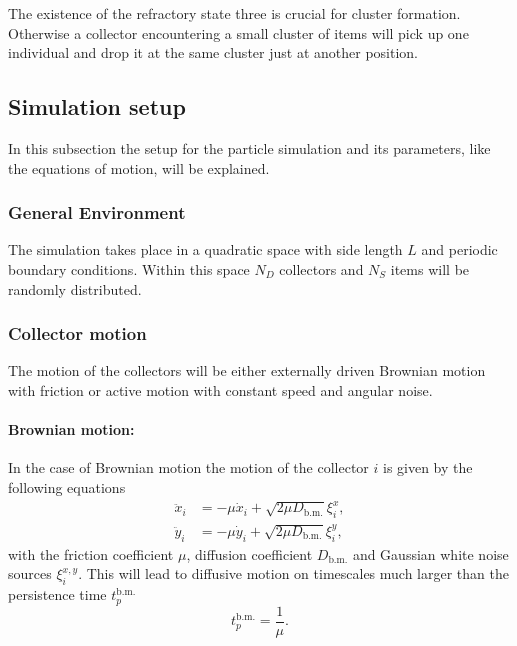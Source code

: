 The existence of the refractory state three is crucial for cluster formation.
Otherwise a collector encountering a small cluster of items will pick up one individual and drop it at the same cluster just at another position.

\subsection{Simulation setup}\label{sec:simset}

In this subsection the setup for the particle simulation and its parameters, like the equations of motion,  will be explained.

\subsubsection{General Environment}

The simulation takes place in a quadratic space with side length $L$ and periodic boundary conditions.
Within this space $N_D$ collectors and $N_S$ items will be randomly distributed.

\subsubsection{Collector motion}

The motion of the collectors will be either externally driven Brownian motion with friction or active motion with constant speed and angular noise.

\paragraph{Brownian motion:}

In the case of Brownian motion the motion of the collector $i$ is given by the following equations
%
\begin{align}
 \nonumber \ddot{x}_i &= -\mu\dot x_i+\sqrt{2\mu D_{\text{b.m.}}}\xi_i^x,\\
 \ddot{y}_i &= -\mu\dot y_i+\sqrt{2\mu D_{\text{b.m.}}}\xi_i^y,
\label{eq:DGLbrm_simset}
\end{align}
with the friction coefficient $\mu$, diffusion coefficient $D_{\text{b.m.}}$ and Gaussian white noise sources $\xi_i^{x,y}$. This will lead to diffusive motion on timescales much larger than the persistence time $t_p^{\text{b.m.}}$
%
\begin{equation}
	t_p^{\text{b.m.}} = \frac{1}{\mu}.
\label{eq:perstimeBM_simset}
\end{equation}

